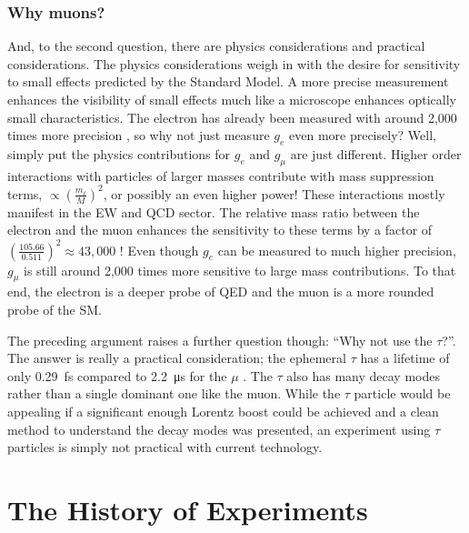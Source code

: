 \subsubsection{Why muons?}
And, to the second question, there are physics considerations and practical considerations.  The physics considerations weigh in with the desire for sensitivity to small effects predicted by the Standard Model.  A more precise measurement enhances the visibility of small effects much like a microscope enhances optically small characteristics.  The electron \gmtwo has already been measured with around 2,000 times more precision \cite{g-e-measurement}, so why not just measure $g_e$ even more precisely?  Well, simply put the physics contributions for $g_e$ and $g_\mu$ are just different.  Higher order interactions with particles of larger masses contribute with mass suppression terms, $\propto (\frac{m_\ell}{M})^2$, or possibly an even higher power!  These interactions mostly manifest in the EW and QCD sector.  The relative mass ratio between the electron and the muon enhances the sensitivity to these terms by a factor of $(\frac{105.66}{0.511})^2 \approx 43,000$ \cite{the-muon-g-2}!  Even though $g_e$ can be measured to much higher precision, $g_\mu$ is still around 2,000 times more sensitive to large mass contributions.  To that end, the electron \gmtwo is a deeper probe of QED and the muon \gmtwo is a more rounded probe of the SM.  

The preceding argument raises a further question though: ``Why not use the $\tau$?''.  The answer is really a practical consideration; the ephemeral $\tau$ has a lifetime of only \SI{0.29}{\femto\second} compared to \SI{2.2}{\micro\second} for the $\mu$ \cite{codata}.  The $\tau$ also has many decay modes rather than a single dominant one like the muon.  While the $\tau$ particle would be appealing if a significant enough Lorentz boost could be achieved and a clean method to understand the decay modes was presented, an experiment using $\tau$ particles is simply not practical with current technology.

\section{The History of Experiments} \label{sec:history-expt}

